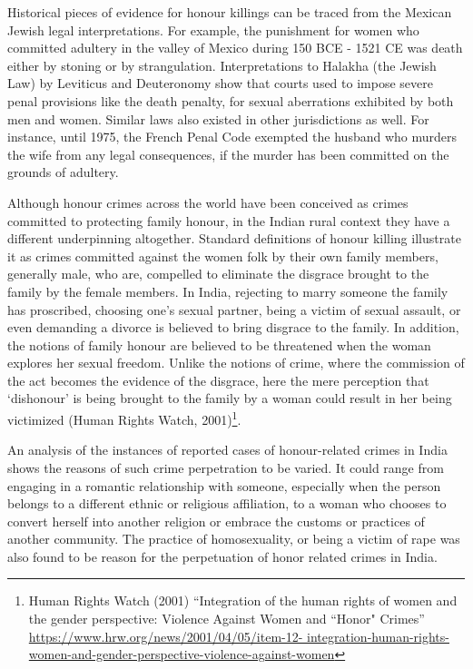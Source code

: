 \begin{multicols}{2}
\noi
Historical pieces of evidence for honour killings can be traced from the Mexican Jewish
legal interpretations. For example, the punishment for women who committed adultery
in the valley of Mexico during 150 BCE - 1521 CE was death either by stoning or by
strangulation. Interpretations to Halakha (the Jewish Law) by Leviticus and
Deuteronomy show that courts used to impose severe penal provisions like the death
penalty, for sexual aberrations exhibited by both men and women. Similar laws also
existed in other jurisdictions as well. For instance, until 1975, the French Penal Code
exempted the husband who murders the wife from any legal consequences, if the
murder has been committed on the grounds of adultery. 



\noi
Although honour crimes across the world have been conceived as crimes committed to
protecting family honour, in the Indian rural context they have a different underpinning
altogether. Standard definitions of honour killing illustrate it as crimes committed
against the women folk by their own family members, generally male, who are,
compelled to eliminate the disgrace brought to the family by the female members. In
India, rejecting to marry someone the family has proscribed, choosing one’s sexual
partner, being a victim of sexual assault, or even demanding a divorce is believed to
bring disgrace to the family. In addition, the notions of family honour are believed to
be threatened when the woman explores her sexual freedom. Unlike the notions of
crime, where the commission of the act becomes the evidence of the disgrace, here the
mere perception that ‘dishonour’ is being brought to the family by a woman could result
in her being victimized (Human Rights Watch, 2001)\footnote{ Human Rights Watch (2001) “Integration of the human rights of women and the gender perspective:
Violence Against Women and “Honor" Crimes” \url{https://www.hrw.org/news/2001/04/05/item-12-
integration-human-rights-women-and-gender-perspective-violence-against-women}}.

\noi
An analysis of the instances of reported cases of honour-related crimes in India shows
the reasons of such crime perpetration to be varied. It could range from engaging in a
romantic relationship with someone, especially when the person belongs to a different
ethnic or religious affiliation, to a woman who chooses to convert herself into another
religion or embrace the customs or practices of another community. The practice of homosexuality, or being a victim of rape was also found to be reason for the
perpetuation of honor related crimes in India.


\end{multicols}
